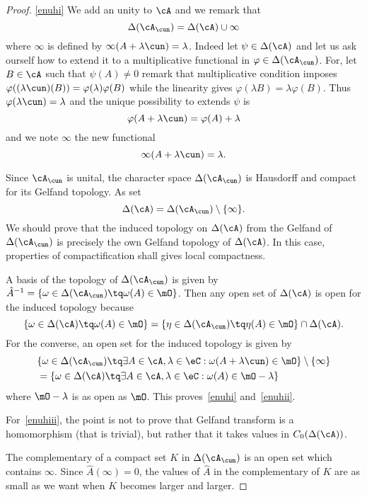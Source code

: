 \begin{proof}
	\ref{enuhi} We add an unity to $\cA$ and we remark that
	\[
		\Delta(\cA_{\cun})=\Delta(\cA)\cup\infty
	\]
	where $\infty$ is defined by $\infty(A+\lambda\cun)=\lambda$. Indeed let $\psi\in\Delta(\cA)$ and let us ask ourself how to extend it to a multiplicative functional in $\varphi\in\Delta(\cA_{\cun})$. For, let $B\in\cA$ such that $\psi(A)\neq 0$ remark that multiplicative condition imposes $\varphi( (\lambda\cun)(B) )=\varphi(\lambda)\varphi(B)$ while the linearity gives $\varphi(\lambda B)=\lambda\varphi(B)$. Thus $\varphi(\lambda\cun)=\lambda$ and the unique possibility to extends $\psi$ is
	\[
		\varphi(A+\lambda\cun)=\varphi(A)+\lambda
	\]
	and we note $\infty$ the new functional
	\[
		\infty(A+\lambda\cun)=\lambda.
	\]

	Since $\cA_{\cun}$ is unital, the character space $\Delta(\cA_{\cun})$  is Hausdorff and compact for its Gelfand topology. As set
	\[
		\Delta(\cA)=\Delta(\cA_{\cun})\setminus\{\infty\}.
	\]
	We should prove that the induced topology on $\Delta(\cA)$ from the Gelfand of $\Delta(\cA_{\cun})$ is precisely the own Gelfand topology of $\Delta(\cA)$. In this case, properties of compactification shall gives local compactness.

	A basis of the topology of $\Delta(\cA_{\cun})$ is given by $\hat A^{-1}=\{\omega\in\Delta(\cA_{\cun})\tq\omega(A)\in\mO\}$. Then any open set of $\Delta(\cA)$ is open for the induced topology because
	\[
		\{\omega\in\Delta(\cA)\tq\omega(A)\in\mO\}=\{\eta\in\Delta(\cA_{\cun})\tq\eta(A)\in\mO\}\cap\Delta(\cA).
	\]
	For the converse, an open set for the induced topology is given by
	\[
		\begin{split}
			&\{\omega\in\Delta(\cA_{\cun})\tq\exists A\in\cA,\lambda\in\eC:\omega(A+\lambda\cun)\in\mO\}\setminus\{\infty\}\\
			&=\{\omega\in\Delta(\cA)\tq\exists A\in\cA,\lambda\in\eC:\omega(A)\in\mO-\lambda\}
		\end{split}
	\]
	where $\mO-\lambda$ is as open as $\mO$. This proves~\ref{enuhi} and~\ref{enuhii}.

	For~\ref{enuhiii}, the point is not to prove that Gelfand transform is a homomorphism (that is trivial), but rather that it takes values in $C_0(\Delta(\cA))$.

	The complementary of a compact set $K$ in $\Delta(\cA_{\cun})$ is an open set which contains $\infty$. Since $\hat A(\infty)=0$, the values of $\hat A$ in the complementary of $K$ are as small as we want when $K$ becomes larger and larger.


\end{proof}
